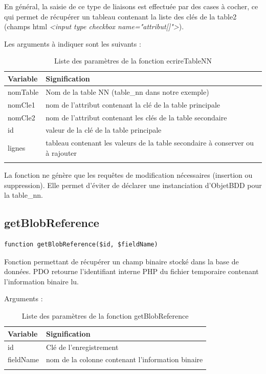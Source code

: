 En général, la saisie de ce type de liaisons est effectuée par des cases à cocher, ce qui permet de récupérer un tableau contenant la liste des clés de la table2 (champs html \textit{<input type checkbox name="attribut[]">}).

Les arguments à indiquer sont les suivants :
\begin{longtable}{|p{3cm}|p{10cm}|}
\hline
\textbf{Variable} & \textbf{Signification} \\
\hline
\endhead
nomTable & Nom de la table NN (table\_nn dans notre exemple) \\

nomCle1 & nom de l'attribut contenant la clé de la table principale \\

nomCle2 & nom de l'attribut contenant les clés de la table secondaire \\

id & valeur de la clé de la table principale \\

lignes & tableau contenant les valeurs de la table secondaire à conserver ou à rajouter \\
\hline

\caption{Liste des paramètres de la fonction ecrireTableNN}
\end{longtable}

La fonction ne génère que les requêtes de modification nécessaires (insertion ou suppression). Elle permet d'éviter de déclarer une instanciation d'ObjetBDD pour la table\_nn.

\subsection{getBlobReference}

\begin{lstlisting}
function getBlobReference($id, $fieldName)
\end{lstlisting}

Fonction permettant de récupérer un champ binaire stocké dans la base de données. PDO retourne l'identifiant interne PHP du fichier temporaire contenant l'information binaire lu.

Arguments :
\begin{longtable}{|p{3cm}|p{10cm}|}
\hline
\textbf{Variable} & \textbf{Signification} \\
\hline
\endhead
id & Clé de l'enregistrement \\

fieldName & nom de la colonne contenant l'information binaire \\
\hline
\caption{Liste des paramètres de la fonction getBlobReference}
\end{longtable}


